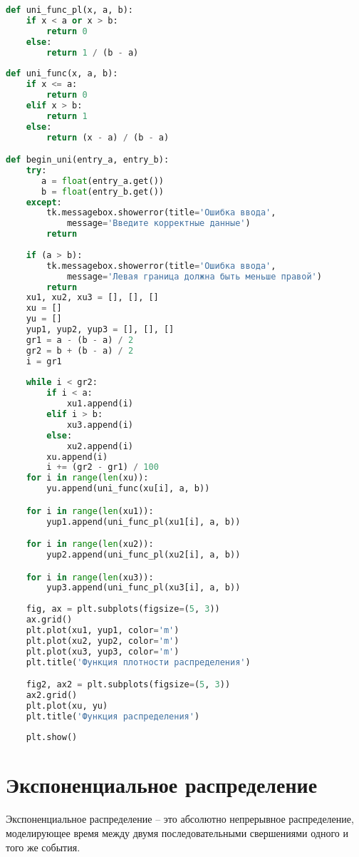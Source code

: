 \documentclass[12pt]{report}
\begin{document}
\begin{lstlisting}[label=some-code,caption=Функии для равномерного распределения, language=Python]
def uni_func_pl(x, a, b):
    if x < a or x > b:
        return 0
    else:
        return 1 / (b - a)
    
def uni_func(x, a, b):
    if x <= a:
        return 0
    elif x > b:
        return 1
    else:
        return (x - a) / (b - a)

def begin_uni(entry_a, entry_b):
    try:
       a = float(entry_a.get())
       b = float(entry_b.get())
    except:
        tk.messagebox.showerror(title='Ошибка ввода', 
            message='Введите корректные данные')
        return
    
    if (a > b):
        tk.messagebox.showerror(title='Ошибка ввода', 
            message='Левая граница должна быть меньше правой')
        return
    xu1, xu2, xu3 = [], [], []
    xu = []
    yu = []
    yup1, yup2, yup3 = [], [], []
    gr1 = a - (b - a) / 2
    gr2 = b + (b - a) / 2
    i = gr1
    
    while i < gr2:
        if i < a:
            xu1.append(i)
        elif i > b:
            xu3.append(i)
        else:
            xu2.append(i)
        xu.append(i)
        i += (gr2 - gr1) / 100
    for i in range(len(xu)):
        yu.append(uni_func(xu[i], a, b))

    for i in range(len(xu1)):
        yup1.append(uni_func_pl(xu1[i], a, b))

    for i in range(len(xu2)):
        yup2.append(uni_func_pl(xu2[i], a, b))

    for i in range(len(xu3)):
        yup3.append(uni_func_pl(xu3[i], a, b))
        
    fig, ax = plt.subplots(figsize=(5, 3))
    ax.grid()
    plt.plot(xu1, yup1, color='m')
    plt.plot(xu2, yup2, color='m')
    plt.plot(xu3, yup3, color='m')
    plt.title('Функция плотности распределения')

    fig2, ax2 = plt.subplots(figsize=(5, 3))
    ax2.grid()
    plt.plot(xu, yu)
    plt.title('Функция распределения')
    
    plt.show()
\end{lstlisting}

\section{Экспоненциальное распределение}
Экспоненциальное распределение -- это абсолютно непрерывное распределение, моделирующее время между двумя последовательными свершениями одного и того же события.\\
\end{document}
